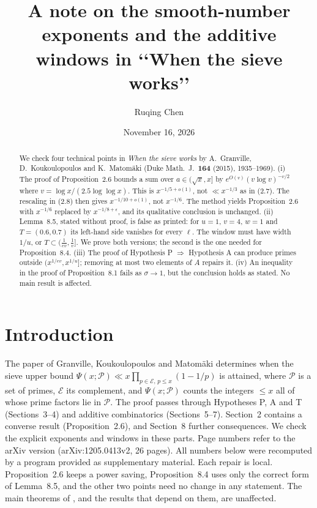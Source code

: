 \documentclass[11pt,a4paper]{amsart}
\title[Exponents and windows in \lq\lq When the sieve works\rq\rq]{A note on the smooth-number exponents and
the additive windows in \texorpdfstring{\lq\lq When the sieve works\rq\rq}{"When the sieve works"}}
\author{Ruqing Chen}
\date{November 16, 2026}
\theoremstyle{remark}
\newcommand{\cP}{\mathcal P}
\newcommand{\cE}{\mathcal E}
\begin{document}
\begin{abstract}
We check four technical points in \emph{When the sieve works} by A.~Granville, D.~Koukoulopoulos and
K.~Matom\"aki (Duke Math.\ J.\ \textbf{164} (2015), 1935--1969). (i) The proof of Proposition~2.6 bounds a sum over
$a\in(\sqrt x,x]$ by $e^{O(v)}(v\log v)^{-v/2}$ where $v=\log x/(2.5\log\log x)$. This is
$x^{-1/5+o(1)}$, not $\ll x^{-1/3}$ as in (2.7). The rescaling in (2.8) then gives $x^{-1/10+o(1)}$, not
$x^{-1/6}$. The method yields Proposition~2.6 with $x^{-1/6}$ replaced by $x^{-1/8+\epsilon}$, and its
qualitative conclusion is unchanged. (ii) Lemma~8.5, stated without proof, is false as printed: for $u=1$, $v=4$,
$w=1$ and $T=(0.6,0.7)$ its left-hand side vanishes for every $\ell$. The window must have width $1/u$, or
$T\subset(\frac1{ev},\frac1v]$. We prove both versions; the second is the one needed for
Proposition~8.4. (iii) The proof of Hypothesis P $\Rightarrow$ Hypothesis A can produce primes outside
$(x^{1/ev},x^{1/u}]$; removing at most two elements of $A$ repairs it. (iv) An inequality in the proof of
Proposition~8.1 fails as $\sigma\to1$, but the conclusion holds as stated. No main result is affected.
\end{abstract}
\maketitle

\section{Introduction}

The paper \cite{GKMat} of Granville, Koukoulopoulos and Matom\"aki determines when the sieve upper bound
$\Psi(x;\cP)\ll x\prod_{p\in\cE,\,p\le x}(1-1/p)$ is attained, where $\cP$ is a set of primes, $\cE$ its
complement, and $\Psi(x;\cP)$ counts the integers $\le x$ all of whose prime factors lie in $\cP$. The
proof passes through Hypotheses P, A and T (Sections~3--4) and additive combinatorics (Sections~5--7).
Section~2 contains a converse result (Proposition~2.6), and Section~8 further consequences. We check the
explicit exponents and windows in these parts. Page numbers refer to the arXiv version
(arXiv:1205.0413v2, 26 pages). All numbers below were recomputed by a program provided as supplementary
material. Each repair is local. Proposition~2.6 keeps a power saving, Proposition~8.4 uses only the
correct form of Lemma~8.5, and the other two points need no change in any statement. The main theorems
of \cite{GKMat}, and the results that depend on them, are unaffected.
\end{document}
